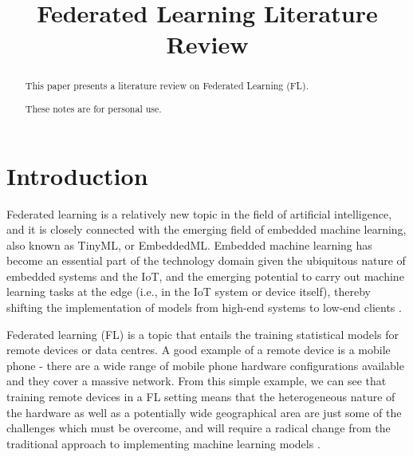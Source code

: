\documentclass[conference]{IEEEtran}
\begin{document}
\title{Federated Learning Literature Review}


\author{
}

\maketitle

\begin{abstract}
This paper presents a literature review on Federated Learning (FL).

\noindent These notes are for personal use.
\end{abstract}

\begin{IEEEkeywords}

\end{IEEEkeywords}

\section{Introduction}
Federated learning is a relatively new topic in the field of artificial intelligence, and it is closely connected with the emerging field of embedded machine learning, also known as TinyML, or EmbeddedML. Embedded machine learning has become an essential part of the technology domain given the ubiquitous nature of embedded systems and the IoT, and the emerging potential to carry out machine learning tasks at the edge (i.e., in the IoT system or device itself), thereby shifting the implementation of models from high-end systems to low-end clients \cite{b1}.

Federated learning (FL) is a topic that entails the training statistical models for remote devices or data centres. A good example of a remote device is a mobile phone - there are a wide range of mobile phone hardware configurations available and they cover a massive network. From this simple example, we can see that training remote devices in a FL setting means that the heterogeneous nature of the hardware as well as a potentially wide geographical area are just some of the challenges which must be overcome, and will require a radical change from the traditional approach to implementing machine learning models \cite{b2}.
\end{document}
